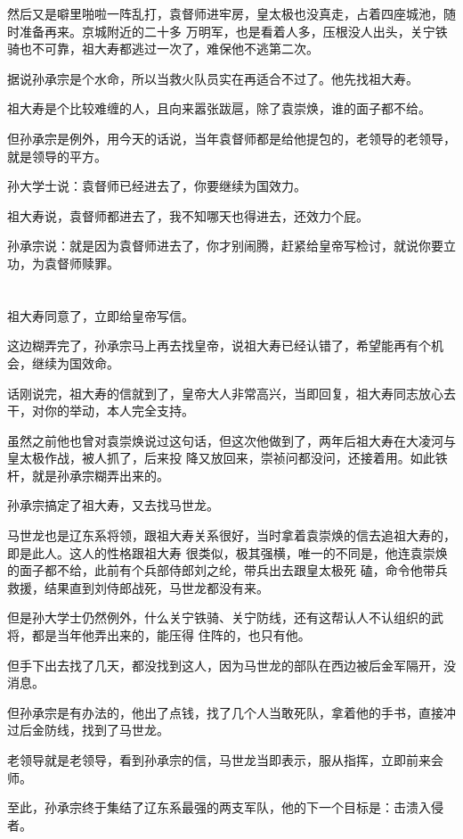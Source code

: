 \documentclass[11pt,a4paper,onecolumn]{article}
\begin{document}
然后又是噼里啪啦一阵乱打，袁督师进牢房，皇太极也没真走，占着四座城池，随时准备再来。京城附近的二十多
万明军，也是看着人多，压根没人出头，关宁铁骑也不可靠，祖大寿都逃过一次了，难保他不逃第二次。

据说孙承宗是个水命，所以当救火队员实在再适合不过了。他先找祖大寿。

祖大寿是个比较难缠的人，且向来嚣张跋扈，除了袁崇焕，谁的面子都不给。

但孙承宗是例外，用今天的话说，当年袁督师都是给他提包的，老领导的老领导，就是领导的平方。

孙大学士说：袁督师已经进去了，你要继续为国效力。

祖大寿说，袁督师都进去了，我不知哪天也得进去，还效力个屁。

孙承宗说：就是因为袁督师进去了，你才别闹腾，赶紧给皇帝写检讨，就说你要立功，为袁督师赎罪。

\section[\thesection]{}

祖大寿同意了，立即给皇帝写信。

这边糊弄完了，孙承宗马上再去找皇帝，说祖大寿已经认错了，希望能再有个机会，继续为国效命。

话刚说完，祖大寿的信就到了，皇帝大人非常高兴，当即回复，祖大寿同志放心去干，对你的举动，本人完全支持。

虽然之前他也曾对袁崇焕说过这句话，但这次他做到了，两年后祖大寿在大凌河与皇太极作战，被人抓了，后来投
降又放回来，崇祯问都没问，还接着用。如此铁杆，就是孙承宗糊弄出来的。

孙承宗搞定了祖大寿，又去找马世龙。

马世龙也是辽东系将领，跟祖大寿关系很好，当时拿着袁崇焕的信去追祖大寿的，即是此人。这人的性格跟祖大寿
很类似，极其强横，唯一的不同是，他连袁崇焕的面子都不给，此前有个兵部侍郎刘之纶，带兵出去跟皇太极死
磕，命令他带兵救援，结果直到刘侍郎战死，马世龙都没有来。

但是孙大学士仍然例外，什么关宁铁骑、关宁防线，还有这帮认人不认组织的武将，都是当年他弄出来的，能压得
住阵的，也只有他。

但手下出去找了几天，都没找到这人，因为马世龙的部队在西边被后金军隔开，没消息。

但孙承宗是有办法的，他出了点钱，找了几个人当敢死队，拿着他的手书，直接冲过后金防线，找到了马世龙。

老领导就是老领导，看到孙承宗的信，马世龙当即表示，服从指挥，立即前来会师。

至此，孙承宗终于集结了辽东系最强的两支军队，他的下一个目标是：击溃入侵者。
\end{document}
